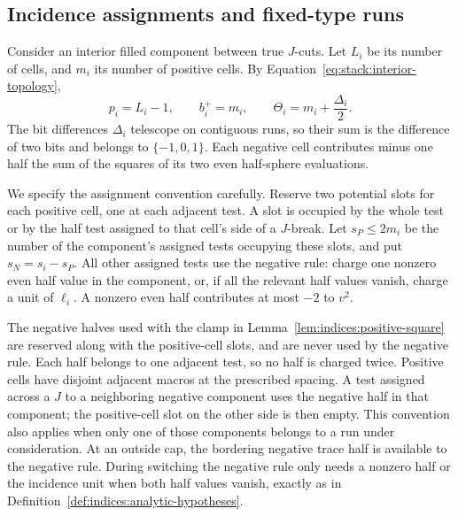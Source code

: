 \subsection{Incidence assignments and fixed-type runs}

Consider an interior filled component between true $J$-cuts.  Let $L_i$
be its number of cells, and $m_i$ its number of positive cells.  By
Equation~\eqref{eq:stack:interior-topology},
\begin{equation}\label{eq:indices:interior-data}
 p_i=L_i-1,\qquad b_i^+=m_i,\qquad
 \Theta_i=m_i+\frac{\Delta_i}{2}.
\end{equation}
The bit differences $\Delta_i$ telescope on contiguous runs, so their
sum is the difference of two bits and belongs to $\{-1,0,1\}$.
Each negative cell contributes minus one half the sum of the squares of
its two even half-sphere evaluations.

We specify the assignment convention carefully.  Reserve two potential
slots for each positive cell, one at each adjacent test.  A slot is
occupied by the whole test or by the half test assigned to that cell's
side of a $J$-break.  Let $s_P\le2m_i$ be the number
of the component's assigned tests occupying these slots, and put
$s_N=s_i-s_P$.  All other assigned tests use the negative rule: charge one
nonzero even half value in the component, or, if all the relevant half
values vanish, charge a unit of $\ell_i$.  A nonzero even half contributes
at most $-2$ to $v^2$.

The negative halves used with the clamp in
Lemma~\ref{lem:indices:positive-square} are reserved along with the
positive-cell slots, and are never used by the negative rule.  Each half
belongs to one adjacent test, so no half is charged twice.  Positive
cells have disjoint adjacent macros at the prescribed spacing.  A test
assigned across a $J$ to a neighboring negative component uses the
negative half in that component; the positive-cell slot on the other side
is then empty.  This convention also applies when only one of those
components belongs to a run under consideration.  At an outside cap,
the bordering negative trace half is available to the negative rule.
During switching the negative rule only needs a nonzero half or the
incidence unit when both half values vanish, exactly as in
Definition~\ref{def:indices:analytic-hypotheses}.

